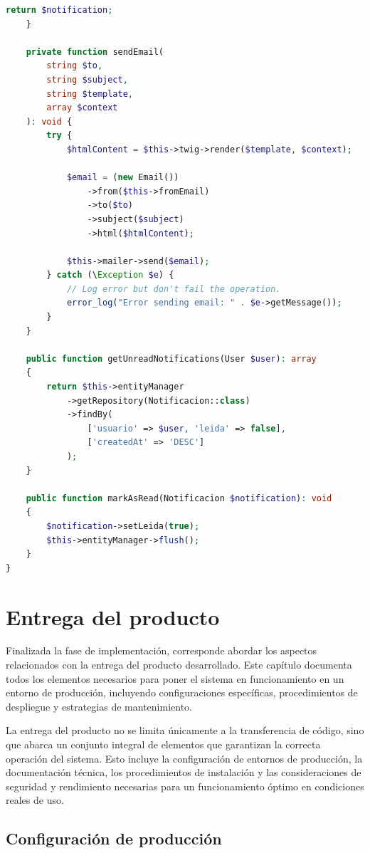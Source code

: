 \documentclass[12pt,a4paper,oneside]{report}
\begin{document}
\begin{lstlisting}[language=PHP]
        return $notification;
    }

    private function sendEmail(
        string $to,
        string $subject,
        string $template,
        array $context
    ): void {
        try {
            $htmlContent = $this->twig->render($template, $context);

            $email = (new Email())
                ->from($this->fromEmail)
                ->to($to)
                ->subject($subject)
                ->html($htmlContent);

            $this->mailer->send($email);
        } catch (\Exception $e) {
            // Log error but don't fail the operation.
            error_log("Error sending email: " . $e->getMessage());
        }
    }

    public function getUnreadNotifications(User $user): array
    {
        return $this->entityManager
            ->getRepository(Notificacion::class)
            ->findBy(
                ['usuario' => $user, 'leida' => false],
                ['createdAt' => 'DESC']
            );
    }

    public function markAsRead(Notificacion $notification): void
    {
        $notification->setLeida(true);
        $this->entityManager->flush();
    }
}
\end{lstlisting}

\chapter{Entrega del producto}\label{entrega-del-producto}

Finalizada la fase de implementación, corresponde abordar los aspectos
relacionados con la entrega del producto desarrollado. Este capítulo
documenta todos los elementos necesarios para poner el sistema en
funcionamiento en un entorno de producción, incluyendo configuraciones
específicas, procedimientos de despliegue y estrategias de
mantenimiento.

La entrega del producto no se limita únicamente a la transferencia de
código, sino que abarca un conjunto integral de elementos que garantizan
la correcta operación del sistema. Esto incluye la configuración de
entornos de producción, la documentación técnica, los procedimientos de
instalación y las consideraciones de seguridad y rendimiento necesarias
para un funcionamiento óptimo en condiciones reales de uso.

\section{Configuración de
producción}\label{configuraciuxf3n-de-producciuxf3n}
\end{document}
